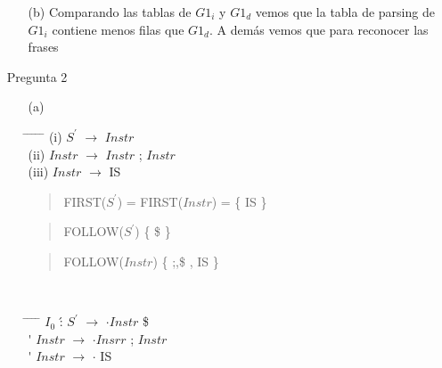 \documentclass{article}
\begin{document}
\begin{enumerate}
\begin{enumerate}
\begin{enumerate}
						\end{enumerate}
					\item[(b)] Comparando las tablas de $G1_{i}$ y $G1_{d}$ vemos que la tabla de parsing de $G1_{i}$ contiene menos filas que $G1_{d}$. A dem\'as vemos que para reconocer las frases  
					
					\end{enumerate}
				\large \bf \item[] Pregunta 2
				\normalsize \mdseries
					\begin{enumerate}
					\item[(a)]								
					\begin{tabbing}
								\hspace*{1cm} \= \hspace*{1cm} \= \hspace*{1cm} \= \hspace*{0.6cm} \= \hspace*{0.6cm} \= \hspace*{3cm} \kill
									\> (i)\>  $S^{\prime}$	\> $\longrightarrow$\> 	$Instr$ 	\\
									\> (ii)\>  $Instr$	\> $\longrightarrow$\> 	$Instr$ ; $Instr$ 	\\
									\> (iii)\>  $Instr$	\> $\longrightarrow$\>  IS 	\\
					\end{tabbing}
					\begin{quotation}
						FIRST($S^{\prime}$) =  FIRST($Instr$) = \{ IS \}
					\end{quotation}		
					\begin{quotation}
						FOLLOW($S^{\prime}$) \{ \$ \}
					\end{quotation}
					\begin{quotation}
						FOLLOW($Instr$) \{ ;,\$ , IS \}
					\end{quotation}						
					\ \ 
					\begin{tabbing}
					 \hspace*{1cm} \= \hspace*{1cm} \= \hspace*{0.8cm} \= \hspace*{0.6cm} \= \hspace*{3cm} \kill
						\> $I_{0}$	\' : 	\> $S^{\prime}$		\> $\longrightarrow$\> 	$\cdot Instr$ \$	\\
						\>			\'  	\> $Instr$ 			\> $\longrightarrow$\> 	$\cdot Insrr$ ; $Instr$	\\
						\>			\'  	\> $Instr$ 			\> $\longrightarrow$\> 	$\cdot$ IS	\\



\end{tabbing}
\end{enumerate}
\end{enumerate}
\end{document}
